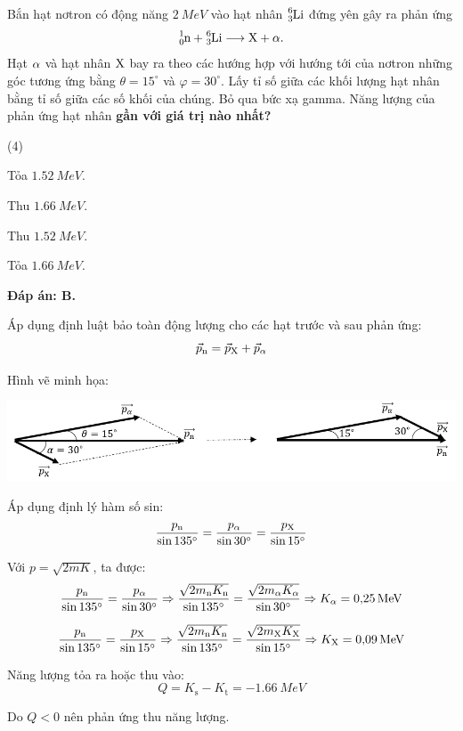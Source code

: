 \begin{enumerate}[label=\bfseries Câu \arabic*:]
	\cauhoi
	{Bắn hạt nơtron có động năng $\SI{2}{MeV}$ vào hạt nhân $\ce{^6_3 Li}$ đứng yên gây ra phản ứng
		$$\ce{^1_0 n} + \ce{^6_3 Li} \longrightarrow \ce{X} + \ce{\alpha}.$$
		Hạt $\ce{\alpha}$ và hạt nhân $\ce{X}$ bay ra theo các hướng hợp với hướng tới của nơtron những góc tương ứng bằng $\theta = 15^\circ$ và $\varphi = 30^\circ$. Lấy tỉ số giữa các khối lượng hạt nhân bằng tỉ số giữa các số khối của chúng. Bỏ qua bức xạ gamma. Năng lượng của phản ứng hạt nhân \textbf{gần với giá trị nào nhất?}
	}
	
	\loigiai
	{		\textbf{Đáp án: B.}
		
		Áp dụng định luật bảo toàn động lượng cho các hạt trước và sau phản ứng:
	$$\vec p_{\ce{n}} = \vec p_{\ce{X}} + \vec p_{\ce{\alpha}}$$
	
	Hình vẽ minh họa:
	\begin{center}
		\includegraphics{../figs/VN12-2021-PH-TP037-1}
	\end{center}
	
	Áp dụng định lý hàm số sin:
	$$\dfrac{p_{\ce{n}}}{\sin 135^\circ} = \dfrac{p_{\ce{\alpha}}}{\sin 30^\circ} = \dfrac{p_{\ce{X}}}{\sin 15^\circ}$$
	
	Với $p=\sqrt{2mK}$, ta được:
	$$\dfrac{p_{\ce{n}}}{\sin 135^\circ} = \dfrac{p_{\ce{\alpha}}}{\sin 30^\circ} \Rightarrow \dfrac{\sqrt{2 m_{\ce{n}} K_{\ce{n}}}}{\sin 135^\circ} = \dfrac{\sqrt{2 m_{\ce{\alpha}} K_{\ce{\alpha}}}}{\sin 30^\circ}\Rightarrow K_{\ce{\alpha}} = \SI{0.25}{MeV} $$
	
	$$\dfrac{p_{\ce{n}}}{\sin 135^\circ} = \dfrac{p_{\ce{X}}}{\sin 15^\circ} \Rightarrow \dfrac{\sqrt{2 m_{\ce{n}} K_{\ce{n}}}}{\sin 135^\circ} = \dfrac{\sqrt{2 m_{\ce{X}} K_{\ce{X}}}}{\sin 15^\circ}\Rightarrow K_{\ce{X}} = \SI{0.09}{MeV} $$
	
	Năng lượng tỏa ra hoặc thu vào:
	$$Q=K_{\text{s}} - K_{\text{t}} = \SI{-1.66}{MeV}$$
	
	Do $Q<0$ nên phản ứng thu năng lượng.
	}
	
	
	
	
	
	
\end{enumerate}

